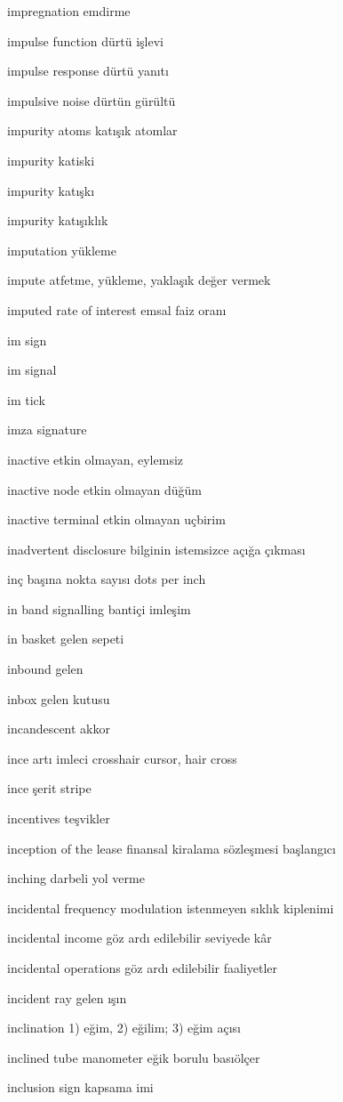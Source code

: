 \documentclass[12pt,fleqn]{article}\usepackage{../../common}
\begin{document}
impregnation emdirme

impulse function dürtü işlevi

impulse response dürtü yanıtı

impulsive noise dürtün gürültü

impurity atoms katışık atomlar

impurity katiski

impurity katışkı

impurity katışıklık

imputation yükleme

impute atfetme, yükleme, yaklaşık değer vermek

imputed rate of interest emsal faiz oranı

im sign

im signal

im tick

imza signature

inactive etkin olmayan, eylemsiz

inactive node etkin olmayan düğüm

inactive terminal etkin olmayan uçbirim

inadvertent disclosure bilginin istemsizce açığa çıkması

inç başına nokta sayısı dots per inch

in band signalling bantiçi imleşim

in basket gelen sepeti

inbound gelen

inbox gelen kutusu

incandescent akkor

ince artı imleci crosshair cursor, hair cross

ince şerit stripe

incentives teşvikler

inception of the lease finansal kiralama sözleşmesi başlangıcı

inching darbeli yol verme

incidental frequency modulation istenmeyen sıklık kiplenimi

incidental income göz ardı edilebilir seviyede kâr

incidental operations göz ardı edilebilir faaliyetler

incident ray gelen ışın

inclination 1) eğim, 2) eğilim; 3) eğim açısı

inclined tube manometer eğik borulu basıölçer

inclusion sign kapsama imi
\end{document}
